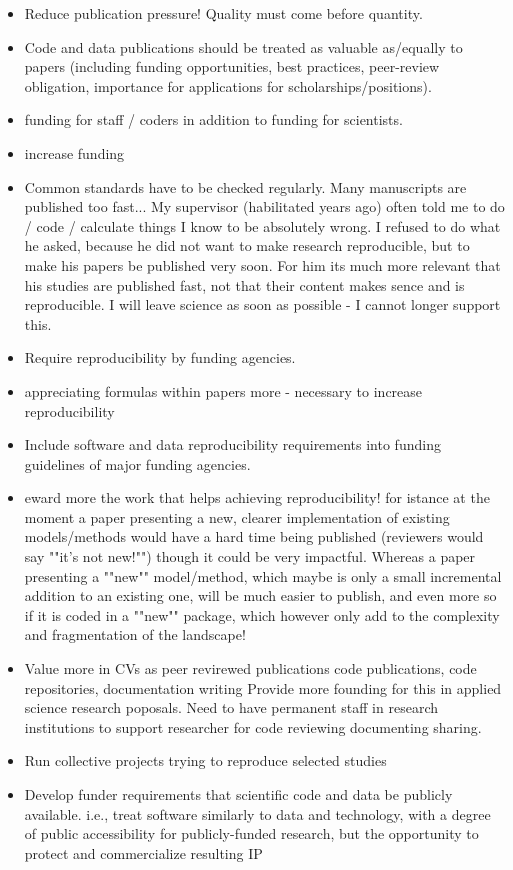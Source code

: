 \documentclass{article}
\begin{document}
\begin{itemize}
	\item Reduce publication pressure! Quality must come before quantity.
	\item Code and data publications should be treated as valuable as/equally to papers (including funding opportunities, best practices, peer-review obligation, importance for applications for scholarships/positions).
	\item funding for staff / coders in addition to funding for scientists.
	\item increase funding
	\item Common standards have to be checked regularly. Many manuscripts are published too fast...
My supervisor (habilitated years ago) often told me to do / code / calculate things I know to be absolutely wrong. I refused to do what he asked, because he did not want to make research reproducible, but to make his papers be published very soon. For him its much more relevant that his studies are published fast, not that their content makes sence and is reproducible. 
I will leave science as soon as possible - I cannot longer support this.
	\item Require reproducibility by funding agencies. 
	\item appreciating formulas within papers more - necessary to increase reproducibility 
	\item Include software and data reproducibility requirements into funding guidelines of major funding agencies.
	\item eward more the work that helps achieving reproducibility! for istance at the moment a paper presenting a new, clearer implementation of existing models/methods would have a hard time being published (reviewers would say ""it's not new!"") though it could be very impactful. Whereas a paper presenting a ""new"" model/method, which maybe is only a small incremental addition to an existing one, will be much easier to publish, and even more so if it is coded in a ""new"" package, which however only add to the complexity and fragmentation of the landscape!  
	\item Value more in CVs as peer revirewed publications code publications, code repositories, documentation writing Provide more founding for this in applied science research poposals. Need to have permanent staff in research institutions to support researcher for code reviewing documenting sharing. 
	\item Run collective projects trying to reproduce selected studies
	\item Develop funder requirements that scientific code and data be publicly available.  i.e., treat software similarly to data and technology, with a degree of public accessibility for publicly-funded research, but the opportunity to protect and commercialize resulting IP

\end{itemize}
\end{document}
